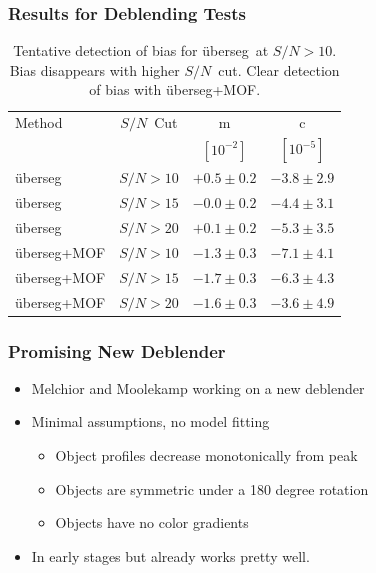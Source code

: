 \documentclass{beamer}
\newcommand{\snr}{$S/N$}
\newcommand{\uberseg}{{\"u}berseg}
\begin{document}
\frame
{

    \frametitle{Results for Deblending Tests}

\begin{table}
    \centering
    \begin{tabular}{|l|c|c|c|}
        \hline
        Method         & \snr\ Cut & m            & c            \\
                       &           & $[10^{-2}]$  & $[10^{-5}]$  \\
        \hline

		\hline
        \uberseg       & \snr$ > 10$ & $+0.5 \pm 0.2$  & $-3.8 \pm 2.9$ \\
        \uberseg       & \snr$ > 15$ & $-0.0 \pm 0.2$  & $-4.4 \pm 3.1$ \\
        \uberseg       & \snr$ > 20$ & $+0.1 \pm 0.2$  & $-5.3 \pm 3.5$ \\

        \hline
        \uberseg+MOF   & \snr$ > 10$ & $-1.3 \pm 0.3$ & $-7.1 \pm 4.1$ \\
        \uberseg+MOF   & \snr$ > 15$ & $-1.7 \pm 0.3$ & $-6.3 \pm 4.3$ \\
        \uberseg+MOF   & \snr$ > 20$ & $-1.6 \pm 0.3$ & $-3.6 \pm 4.9$ \\


		\hline
    \end{tabular}
    \caption{Tentative detection of bias for \uberseg\ at \snr$>10$.
    Bias disappears with higher \snr\ cut.
    Clear detection of bias with \uberseg+MOF.
     \label{tab:mcal:deblending}}
\end{table}


}

\frame
{

    \frametitle{Promising New Deblender}

 

    \begin{itemize}

        \item Melchior and Moolekamp working on a new
            deblender

        \item Minimal assumptions, no model fitting
            \begin{itemize}
                \item Object profiles decrease monotonically from peak
                \item Objects are symmetric under a 180 degree rotation
                \item Objects have no color gradients
            \end{itemize}

        \item In early stages but already works pretty well.
    \end{itemize}


}
\end{document}
